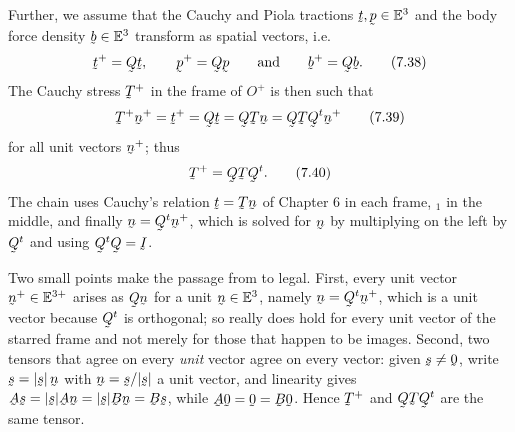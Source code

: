 Further, we assume that the Cauchy and Piola tractions $\bt,\bp\in\Et$
and the body force density $\bb\in\Et$ transform as spatial vectors, i.e.
\begin{equation}
   \bt^{+}=\bQ\bt,\qquad \bp^{+}=\bQ\bp
   \qquad\text{and}\qquad \bb^{+}=\bQ\bb .
   \tag{7.38}\label{eq:7.38}
\end{equation}
The Cauchy stress $\bT^{+}$ in the frame of $O^{+}$ is then such that
\begin{equation}
   \bT^{+}\bn^{+}=\bt^{+}=\bQ\bt=\bQ\bT\bn=\bQ\bT\bQ^{t}\bn^{+}
   \tag{7.39}\label{eq:7.39}
\end{equation}
for all unit vectors $\bn^{+}$; thus
\begin{equation}
   \bT^{+}=\bQ\bT\bQ^{t}.
   \tag{7.40}\label{eq:7.40}
\end{equation}
The chain  uses Cauchy's relation $\bt=\bT\bn$ of Chapter 6 in
each frame, $_{1}$ in the middle, and finally
$\bn=\bQ^{t}\bn^{+}$, which is  solved for $\bn$ by
multiplying on the left by $\bQ^{t}$ and using $\bQ^{t}\bQ=\I$.

Two small points make the passage from  to  legal.
First, every unit vector $\bn^{+}\in\mathbb{E}^{3+}$ arises as $\bQ\bn$
for a unit $\bn\in\Et$, namely $\bn=\bQ^{t}\bn^{+}$, which is a unit
vector because $\bQ^{t}$ is orthogonal; so  really does hold
for every unit vector of the starred frame and not merely for those that
happen to be images. Second, two tensors that agree on every \emph{unit}
vector agree on every vector: given $\bs\neq\bze$, write
$\bs=|\bs|\,\bn$ with $\bn=\bs/|\bs|$ a unit vector, and linearity gives
$\bA\bs=|\bs|\bA\bn=|\bs|\bB\bn=\bB\bs$, while $\bA\bze=\bze=\bB\bze$.
Hence $\bT^{+}$ and $\bQ\bT\bQ^{t}$ are the same tensor.

